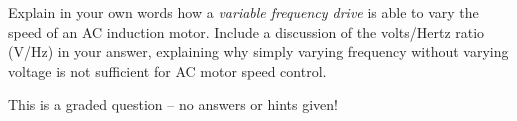

Explain in your own words how a {\it variable frequency drive} is able to vary the speed of an AC induction motor.  Include a discussion of the volts/Hertz ratio (V/Hz) in your answer, explaining why simply varying frequency without varying voltage is not sufficient for AC motor speed control.

\vfil

\eject






This is a graded question -- no answers or hints given!












